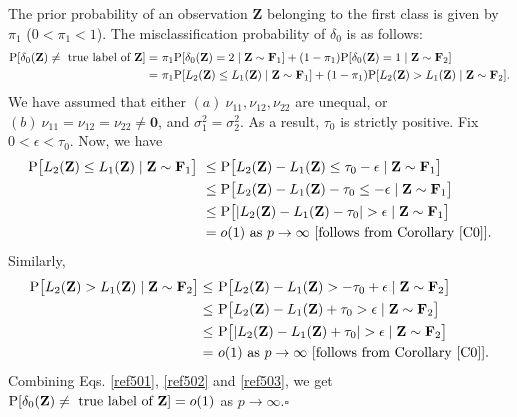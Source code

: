 \documentclass[twoside]{article}
\newcommand{\bZ}{\mathbf{Z}}
\newcommand{\bF}{\mathbf{F}}
\newcommand{\0}{\mathbf{0}}
\newcommand{\1}{\mathbf{1}}
\newcommand*{\QEDB}{\hfill\ensuremath{\square}}
\numberwithin{equation}{section}
\begin{document}

The prior probability of an observation $\bZ$ belonging to the first class is given by $\pi_1$ ($0<\pi_1<1$). The misclassification probability of $\delta_0$ is as follows:
\begin{align}\label{ref501}
{\rm P}[\delta_0(\bZ)\neq \text{ true label of }\bZ]
 =&\ \pi_1 {\rm P}[\delta_0(\bZ)=2\mid \bZ\sim\bF_1] + (1-\pi_1){\rm P}[\delta_0(\bZ)=1\mid \bZ\sim\bF_2]\nonumber \\
 =&\ \pi_1 {\rm P}[L_2(\bZ)\leq L_1(\bZ)\mid \bZ\sim\bF_1]+ (1-\pi_1){\rm P}[L_2(\bZ)> L_1(\bZ)\mid \bZ\sim\bF_2].
\end{align}
We have assumed that either $(a)\ \nu_{11},\nu_{12},\nu_{22}$ are unequal, or $(b)\ \nu_{11}=\nu_{12}=\nu_{22}\neq \0$, and $\sigma_1^2=\sigma_2^2$. As a result, $\tau_0$ is strictly positive. Fix $0<\epsilon<\tau_0$. Now, we have
\begin{align}\label{ref502}
{\rm P}\big [L_2(\bZ)\leq L_1(\bZ)\mid \bZ\sim\bF_1\big ]
&\ \leq {\rm P}\big [L_2(\bZ)- L_1(\bZ)\leq \tau_0-\epsilon\mid \bZ\sim\bF_1\big ]\nonumber \\
&\ \leq {\rm P}\big [L_2(\bZ)- L_1(\bZ)- \tau_0 \leq -\epsilon\mid \bZ\sim\bF_1\big ]\nonumber \\
&\ \leq {\rm P}\big [|L_2(\bZ)- L_1(\bZ) - \tau_0|>\epsilon\mid \bZ\sim\bF_1\big ]\nonumber\\
&\ =o(1)\text{ as }p\to\infty\ [\text{follows from Corollary \ref{C0}}].
\end{align}
Similarly,
\begin{align}\label{ref503}
{\rm P}\big [L_2(\bZ)> L_1(\bZ)\mid \bZ\sim\bF_2\big ]
\leq &\ {\rm P}\big [L_2(\bZ)- L_1(\bZ)> -\tau_0+\epsilon\mid \bZ\sim\bF_2\big ]\nonumber \\
\leq &\ {\rm P}\big [L_2(\bZ)- L_1(\bZ)+ \tau_0 > \epsilon\mid \bZ\sim\bF_2\big ]\nonumber \\
\leq &\ {\rm P}\big [|L_2(\bZ)- L_1(\bZ) + \tau_0|>\epsilon\mid \bZ\sim\bF_2\big ]\nonumber\\
=&\ o(1)\text{ as }p\to\infty\ [\text{follows from Corollary \ref{C0}}].
\end{align}
Combining Eqs. \eqref{ref501}, \eqref{ref502} and \eqref{ref503}, we get ${\rm P}[\delta_0(\bZ)\neq \text{ true label of }\bZ]=o(1)$ as $p\to\infty$.\hfill\QEDB\newline
\end{document}
